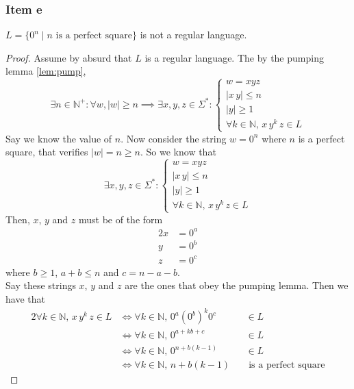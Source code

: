 {\subsubsection{Item e}
\begin{theorem}
$L=\{0^n\mid n \text{ is a perfect square}\}$ is not a regular language.
\end{theorem}
\begin{proof}
Assume  by absurd that $L$ is a regular language. The by the pumping lemma \eqref{lem:pump},
\begin{equation*}
	\exists n \in \mathbb{N}^+ \colon \forall w, |w|\geq n \implies \exists x, y, z \in \Sigma^* \colon 
	\begin{cases}
		w = xyz \\
		|x\,y| \leq n\\
		|y| \geq 1\\
		\forall k \in \mathbb{N},\,x\,y^k\,z \in L
\end{cases}
\end{equation*}
Say we know the value of $n$. Now consider the string $w=0^n$ where $n$ is a perfect square, that verifies $|w|=n \geq n$. So we know that
\begin{equation*}
\exists x, y, z \in \Sigma^* \colon 
\begin{cases}
	w = xyz \\
	|x\,y| \leq n\\
	|y| \geq 1\\
	\forall k \in \mathbb{N},\,x\,y^k\,z \in L
\end{cases}
\end{equation*}
Then, $x$, $y$ and $z$ must be of the form
\begin{alignat*}{2}
	x &= 0^a\\
	y &= 0^b\\
	z &= 0^c
\end{alignat*}
where $b \geq 1$, $a+b \leq n$ and $c=n-a-b$.\\
Say these strings $x$, $y$ and $z$ are the ones that obey the pumping lemma. Then we have that
\begin{alignat*}{2}
	\forall k \in \mathbb{N},\,x\,y^k\,z \in L
	& \iff \forall k \in \mathbb{N},\,0^a(0^b)^k0^c && \in L \\
	& \iff \forall k \in \mathbb{N},\,0^{a+kb+c}    && \in L \\
	& \iff \forall k \in \mathbb{N},\,0^{n+b(k-1)}  && \in L \\
	& \iff \forall k \in \mathbb{N},\,n+b(k-1)      && \text{ is a perfect square}
\end{alignat*}

\end{proof}}
